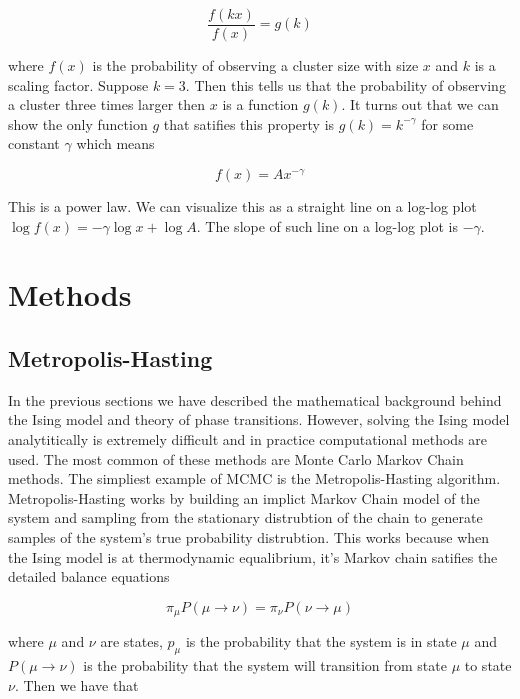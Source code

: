 \documentclass{article}
\begin{document}
\begin{equation}
    \frac{f(kx)}{f(x)} = g(k)
\end{equation}

where $f(x)$ is the probability of observing a cluster size with size $x$ and $k$ is a scaling factor.
Suppose $k=3$. Then this tells us that the probability of observing a cluster three times larger then $x$
is a function $g(k)$. It turns out that we can show the only function $g$ that satifies this property is
$g(k) = k^{-\gamma}$ for some constant $\gamma$ which means


\begin{equation}
    f(x) = A x^{-\gamma}
\end{equation}

This is a power law. We can visualize this as a straight line on a log-log plot $\log f(x) = -\gamma \log x + \log A$.
The slope of such line on a log-log plot is $-\gamma$.
 
\section{Methods}
\label{Methods}

\subsection{Metropolis-Hasting}
In the previous sections we have described the mathematical background behind the Ising model and theory of phase transitions.
However, solving the Ising model analytitically is extremely difficult and in practice computational methods are used. The most common of these methods 
are Monte Carlo Markov Chain methods. The simpliest example of MCMC is the Metropolis-Hasting algorithm. Metropolis-Hasting works by building 
an implict Markov Chain model of the system and sampling from the stationary distrubtion of the chain to generate samples of the system's true probability
distrubtion. This works because when the Ising model is at thermodynamic equalibrium, it's Markov chain satifies the detailed balance equations

\begin{equation}
    \pi_{\mu} P(\mu \rightarrow \nu) = \pi_{\nu} P(\nu \rightarrow \mu)
\end{equation}

where $\mu$ and $\nu$ are states, $p_{\mu}$ is the probability that the system is in state $\mu$ and $P(\mu \rightarrow \nu)$
is the probability that the system will transition from state $\mu$ to state $\nu$. Then we have that 
\end{document}
